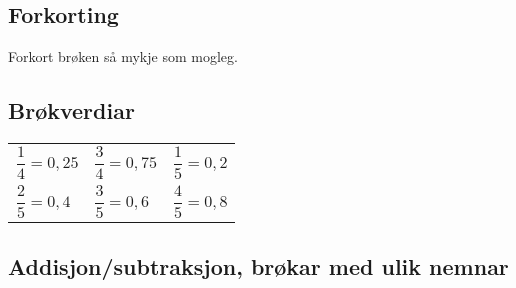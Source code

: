 \subsection*{Forkorting}
Forkort brøken så mykje som mogleg. \os

\subsection{Brøkverdiar}

\begin{tabular}{p{2cm} p{2cm} p{2cm}}
	$ \dfrac{1}{4}=0,25 $ 
	& $ \dfrac{3}{4}=0,75 $
	& $ \dfrac{1}{5}=0,2 $ \\[20pt]
	$ \dfrac{2}{5}=0,4 $
	& $ \dfrac{3}{5}=0,6$
	& $ \dfrac{4}{5}=0,8 $
\end{tabular}

\subsection*{Addisjon/subtraksjon, brøkar med ulik nemnar}




